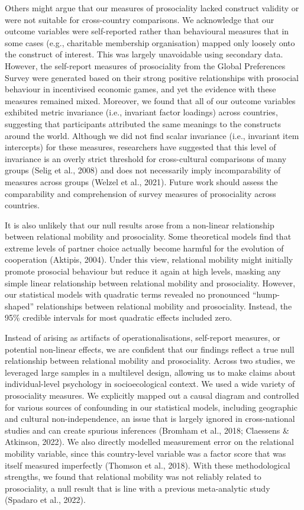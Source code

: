 \documentclass[
  man,floatsintext]{apa6}
\begin{document}
Others might argue that our measures of prosociality lacked construct validity or were not suitable for cross-country comparisons. We acknowledge that our outcome variables were self-reported rather than behavioural measures that in some cases (e.g., charitable membership organisation) mapped only loosely onto the construct of interest. This was largely unavoidable using secondary data. However, the self-report measures of prosociality from the Global Preferences Survey were generated based on their strong positive relationships with prosocial behaviour in incentivised economic games, and yet the evidence with these measures remained mixed. Moreover, we found that all of our outcome variables exhibited metric invariance (i.e., invariant factor loadings) across countries, suggesting that participants attributed the same meanings to the constructs around the world. Although we did not find scalar invariance (i.e., invariant item intercepts) for these measures, researchers have suggested that this level of invariance is an overly strict threshold for cross-cultural comparisons of many groups (Selig et al., 2008) and does not necessarily imply incomparability of measures across groups (Welzel et al., 2021). Future work should assess the comparability and comprehension of survey measures of prosociality across countries.

It is also unlikely that our null results arose from a non-linear relationship between relational mobility and prosociality. Some theoretical models find that extreme levels of partner choice actually become harmful for the evolution of cooperation (Aktipis, 2004). Under this view, relational mobility might initially promote prosocial behaviour but reduce it again at high levels, masking any simple linear relationship between relational mobility and prosociality. However, our statistical models with quadratic terms revealed no pronounced ``hump-shaped'' relationships between relational mobility and prosociality. Instead, the 95\% credible intervals for most quadratic effects included zero.

Instead of arising as artifacts of operationalisations, self-report measures, or potential non-linear effects, we are confident that our findings reflect a true null relationship between relational mobility and prosociality. Across two studies, we leveraged large samples in a multilevel design, allowing us to make claims about individual-level psychology in socioecological context. We used a wide variety of prosociality measures. We explicitly mapped out a causal diagram and controlled for various sources of confounding in our statistical models, including geographic and cultural non-independence, an issue that is largely ignored in cross-national studies and can create spurious inferences (Bromham et al., 2018; Claessens \& Atkinson, 2022). We also directly modelled measurement error on the relational mobility variable, since this country-level variable was a factor score that was itself measured imperfectly (Thomson et al., 2018). With these methodological strengths, we found that relational mobility was not reliably related to prosociality, a null result that is line with a previous meta-analytic study (Spadaro et al., 2022).
\end{document}
